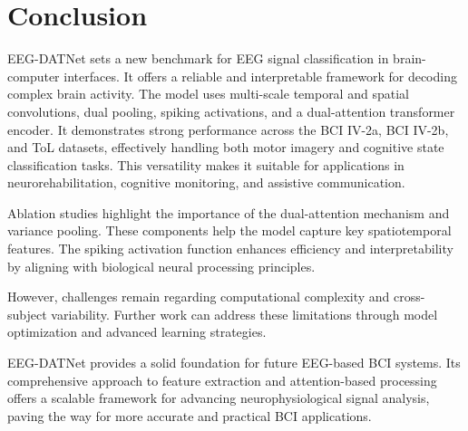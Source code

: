 \documentclass[pdflatex,sn-mathphys-num]{sn-jnl}%
\theoremstyle{thmstyleone}%
\theoremstyle{thmstyletwo}%
\theoremstyle{thmstylethree}%
\begin{document}
\section{Conclusion}

EEG-DATNet sets a new benchmark for EEG signal classification in brain-computer interfaces. It offers a reliable and interpretable framework for decoding complex brain activity. The model uses multi-scale temporal and spatial convolutions, dual pooling, spiking activations, and a dual-attention transformer encoder. It demonstrates strong performance across the BCI IV-2a, BCI IV-2b, and ToL datasets, effectively handling both motor imagery and cognitive state classification tasks. This versatility makes it suitable for applications in neurorehabilitation, cognitive monitoring, and assistive communication.

Ablation studies highlight the importance of the dual-attention mechanism and variance pooling. These components help the model capture key spatiotemporal features. The spiking activation function enhances efficiency and interpretability by aligning with biological neural processing principles.

However, challenges remain regarding computational complexity and cross-subject variability. Further work can address these limitations through model optimization and advanced learning strategies.

EEG-DATNet provides a solid foundation for future EEG-based BCI systems. Its comprehensive approach to feature extraction and attention-based processing offers a scalable framework for advancing neurophysiological signal analysis, paving the way for more accurate and practical BCI applications.



\backmatter





\end{document}
